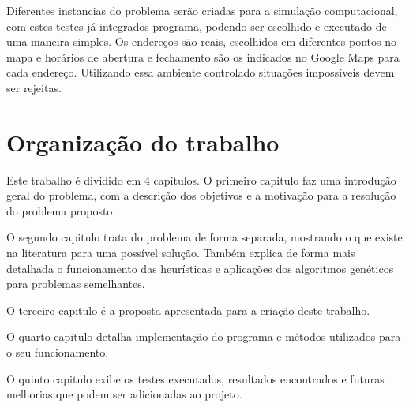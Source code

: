 Diferentes instancias do problema serão criadas para a simulação computacional,  com estes testes já integrados programa, podendo ser escolhido e executado de uma maneira simples. Os endereços são reais, escolhidos em diferentes pontos no mapa e horários de abertura e fechamento são os indicados no Google Maps para cada endereço. 
Utilizando essa ambiente controlado situações impossíveis devem ser rejeitas.

\section{Organização do trabalho}
Este trabalho é dividido em 4 capítulos. 
O primeiro capitulo faz uma introdução geral do problema, com a descrição dos objetivos e a motivação para a resolução do problema proposto.

O segundo capitulo trata do problema de forma separada, mostrando o que existe na literatura para uma possível solução. 
Também explica de forma mais detalhada o funcionamento das heurísticas e aplicações dos algoritmos genéticos para problemas semelhantes.

O terceiro capitulo é a proposta apresentada para a criação deste trabalho.

O quarto capitulo detalha implementação do programa e métodos utilizados para o seu funcionamento.

O quinto capitulo exibe os testes executados, resultados encontrados e futuras melhorias que podem ser adicionadas ao projeto.
